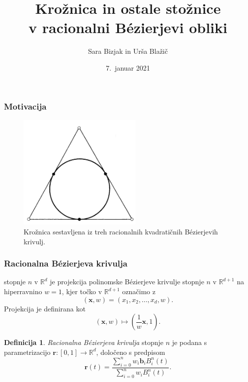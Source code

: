 \documentclass[a4paper, 12pt]{beamer}
\title[CAGD projekt]{Krožnica in ostale stožnice \\
v racionalni B\'ezierjevi obliki
}
\author{Sara Bizjak in Urša Blažič}
\institute[FMF]{Fakulteta za matematiko in fiziko}
\date{7.~januar 2021}
\theoremstyle{definition}
\newtheorem*{definicija}{Definicija}
\theoremstyle{plain}
\begin{document}
\titlepage


\begin{frame}
\frametitle{Motivacija}
    
\begin{figure}[ht!]
    \centering
    \includegraphics[width=60mm]{krog_po_delih.png}
    \caption{Krožnica sestavljena iz treh racionalnih kvadratičnih B\'ezierjevih krivulj.}
    \label{slika:krogpodelih}
\end{figure}
    
    
\end{frame}


\begin{frame}
\frametitle{Racionalna B\'ezierjeva krivulja}
    
    stopnje $n$ v $\mathbb{R}^d$ je projekcija polinomske B\'ezierjeve krivulje stopnje $n$ v $\mathbb{R}^{d+1}$ na hiperravnino $w=1$, kjer točko v  $\mathbb{R}^{d+1}$  označimo z
    $$(\boldsymbol{x},w)=(x_1,x_2,\dots,x_d,w).$$
    Projekcija je definirana kot
    $$(\boldsymbol{x},w)\mapsto (\frac{1}{w}\boldsymbol{x},1).$$

    \begin{definicija}
        \emph{Racionalna B\'ezierjeva krivulja} stopnje $n$ je podana s parametrizacijo $\boldsymbol{r}:[0,1]\rightarrow \mathbb{R}^d$, določeno s predpisom
        $$\boldsymbol{r}(t)=\frac{\sum_{i=0}^n w_i\boldsymbol{b}_iB_i^n(t)}{\sum_{i=0}^n w_iB_i^n(t)}.$$      
    \end{definicija}

\end{frame}


\end{document}
